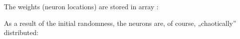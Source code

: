 \documentclass[a4paper,12pt,polish]{jupyterBook}
\begin{document}
\sphinxAtStartPar
The weights (neuron locations) are stored in array :
\begin{sphinxVerbatimInput}

\begin{sphinxVerbatim}[commandchars=\\\{\}]
\PYG{p}{[}    \PYG{p}{]} 
\end{sphinxVerbatim}
\end{sphinxVerbatimInput}

\sphinxAtStartPar
As a result of the initial randomness, the neurons are, of course, „chaotically” distributed:
\begin{sphinxVerbatimOutput}

\noindent{}
\end{sphinxVerbatimOutput}
\end{document}
